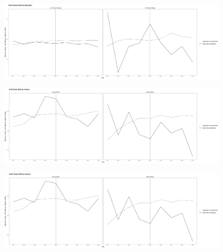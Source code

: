 \documentclass[12pt,letterpaper]{article}
\begin{document}
\begin{figure}[htbp]
    \centering
    \includegraphics[width=0.75\linewidth]{outputs/summary_stats/educ_ante_diffs.png}
    \caption{}
    \label{fig: fig:enter-label}
\end{figure}

\begin{figure}[htbp]
    \centering
    \includegraphics[width=0.75\linewidth]{outputs/summary_stats/inc_post_diffs.png}
    \caption{}
    \label{fig: fig:enter-label}
\end{figure}

\begin{figure}[htbp]
    \centering
    \includegraphics[width=0.75\linewidth]{outputs/summary_stats/inc_ante_diffs.png}
    \caption{}
    \label{fig: fig:enter-label}
\end{figure}

\FloatBarrier
\newpage
\end{document}
